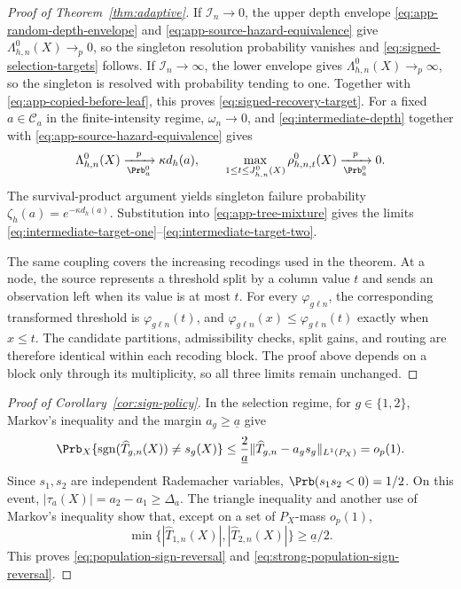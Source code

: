 \begin{appendix}
\begin{proof}[Proof of Theorem~\ref{thm:adaptive}]
If \(\mathcal I_n\to0\), the upper depth envelope
\eqref{eq:app-random-depth-envelope} and
\eqref{eq:app-source-hazard-equivalence} give
\(\Lambda_{h,n}^0(X)\to_p0\), so the singleton resolution probability vanishes
and \eqref{eq:signed-selection-targets} follows. If
\(\mathcal I_n\to\infty\), the lower envelope gives
\(\Lambda_{h,n}^0(X)\to_p\infty\), so the singleton is resolved with probability
tending to one. Together with \eqref{eq:app-copied-before-leaf}, this proves
\eqref{eq:signed-recovery-target}. For a fixed \(a\in\mathcal C_a\) in the
finite-intensity regime,
\(\omega_n\to0\), and \eqref{eq:intermediate-depth} together with
\eqref{eq:app-source-hazard-equivalence} gives
\[
\Lambda_{h,n}^0(X)\xrightarrow[\Prb_a^0]{p}\kappa d_h(a),
\qquad
\max_{1\le t\le J_{h,n}^0(X)}\rho_{h,n,t}^0(X)
\xrightarrow[\Prb_a^0]{p}0.
\]
The survival-product argument yields singleton failure probability
\(\zeta_h(a)=e^{-\kappa d_h(a)}\). Substitution into
\eqref{eq:app-tree-mixture} gives the limits
\eqref{eq:intermediate-target-one}--\eqref{eq:intermediate-target-two}.

The same coupling covers the increasing recodings used in the theorem. At a
node, the source represents a threshold split by a column value \(t\) and sends
an observation left when its value is at most \(t\). For every
\(\varphi_{g\ell n}\), the corresponding transformed threshold is
\(\varphi_{g\ell n}(t)\), and
\(\varphi_{g\ell n}(x)\le\varphi_{g\ell n}(t)\) exactly when \(x\le t\).
The candidate partitions, admissibility checks, split gains, and routing are
therefore identical within each recoding block. The proof above depends on a
block only through its multiplicity, so all three limits remain unchanged.
\end{proof}

\begin{proof}[Proof of Corollary~\ref{cor:sign-policy}]
In the selection regime, for \(g\in\{1,2\}\),
Markov's inequality and the margin \(a_g\ge\underline a\) give
\begin{equation}\label{eq:app-sign-classification}
\Prb_X\{\operatorname{sgn}(\widehat T_{g,n}(X))\ne s_g(X)\}
\le\frac{2}{\underline a}
\|\widehat T_{g,n}-a_gs_g\|_{L^1(P_X)}=o_p(1).
\end{equation}
Since \(s_1,s_2\) are independent Rademacher variables,
\(\Prb(s_1s_2<0)=1/2\). On this event,
\(|\tau_a(X)|=a_2-a_1\ge\Delta_a\). The triangle inequality and another use of
Markov's inequality show that, except on a set of \(P_X\)-mass \(o_p(1)\),
\[
\min\bigl\{|\widehat T_{1,n}(X)|,|\widehat T_{2,n}(X)|\bigr\}
\ge\underline a/2.
\]
This proves
\eqref{eq:population-sign-reversal} and
\eqref{eq:strong-population-sign-reversal}.


\end{proof}
\end{appendix}
